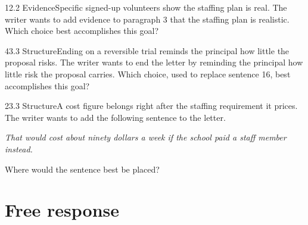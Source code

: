 \documentclass[11pt]{article}
\begin{document}
\begin{q}{1}{2.2 Evidence}{Specific signed-up volunteers show the staffing plan is real.}
The writer wants to add evidence to paragraph 3 that the staffing plan is realistic. Which choice best accomplishes this goal?
\end{q}

\begin{q}{4}{3.3 Structure}{Ending on a reversible trial reminds the principal how little the proposal risks.}
The writer wants to end the letter by reminding the principal how little risk the proposal carries. Which choice, used to replace sentence 16, best accomplishes this goal?
\end{q}

\begin{q}{2}{3.3 Structure}{A cost figure belongs right after the staffing requirement it prices.}
The writer wants to add the following sentence to the letter.

\emph{That would cost about ninety dollars a week if the school paid a staff member instead.}

Where would the sentence best be placed?
\end{q}

\section{Free response}
\end{document}

